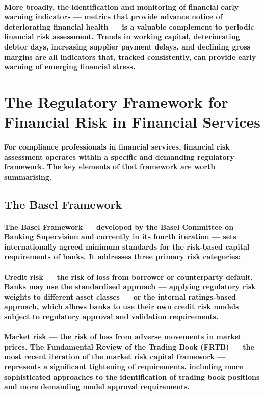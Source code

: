 \paragraph{More broadly, the identification and monitoring of \textbf{financial early warning indicators} — metrics that provide advance notice of deteriorating financial health — is a valuable complement to periodic financial risk assessment. Trends in working capital, deteriorating debtor days, increasing supplier payment delays, and declining gross margins are all indicators that, tracked consistently, can provide early warning of emerging financial stress.}

\section{The Regulatory Framework for Financial Risk in Financial Services}
\paragraph{For compliance professionals in financial services, financial risk assessment operates within a specific and demanding regulatory framework. The key elements of that framework are worth summarising.}

\subsection{The Basel Framework}
\paragraph{The \textbf{Basel Framework} — developed by the Basel Committee on Banking Supervision and currently in its fourth iteration — sets internationally agreed minimum standards for the risk-based capital requirements of banks. It addresses three primary risk categories:}
\paragraph{\textbf{Credit risk} — the risk of loss from borrower or counterparty default. Banks may use the standardised approach — applying regulatory risk weights to different asset classes — or the internal ratings-based approach, which allows banks to use their own credit risk models subject to regulatory approval and validation requirements.}
\paragraph{\textbf{Market risk} — the risk of loss from adverse movements in market prices. The \textbf{Fundamental Review of the Trading Book (FRTB)} — the most recent iteration of the market risk capital framework — represents a significant tightening of requirements, including more sophisticated approaches to the identification of trading book positions and more demanding model approval requirements.}
